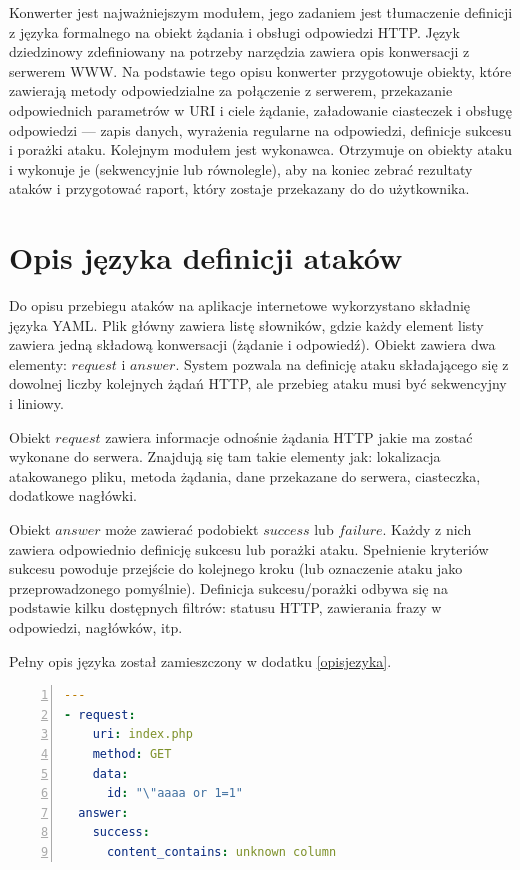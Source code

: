 \documentclass[11pt,a4paper,polish,thesis,oneside]{dcsbook}
\begin{document}
Konwerter jest najważniejszym modułem, jego zadaniem jest tłumaczenie definicji z języka formalnego na obiekt żądania i obsługi odpowiedzi HTTP. Język dziedzinowy zdefiniowany na potrzeby narzędzia zawiera opis konwersacji z serwerem WWW. Na podstawie tego opisu konwerter przygotowuje obiekty, które zawierają metody odpowiedzialne za połączenie z serwerem, przekazanie odpowiednich parametrów w URI i ciele żądanie, załadowanie ciasteczek i obsługę odpowiedzi --- zapis danych, wyrażenia regularne na odpowiedzi, definicje sukcesu i porażki ataku.
Kolejnym modułem jest wykonawca. Otrzymuje on obiekty ataku i wykonuje je (sekwencyjnie lub równolegle), aby na koniec zebrać rezultaty ataków i przygotować raport, który zostaje przekazany do do użytkownika.
 
\section{Opis języka definicji ataków} 
Do opisu przebiegu ataków na aplikacje internetowe wykorzystano składnię języka YAML.
Plik główny zawiera listę słowników, gdzie każdy element listy zawiera jedną składową konwersacji (żądanie i odpowiedź). Obiekt zawiera dwa elementy: $request$ i $answer$. System pozwala na definicję ataku składającego się z dowolnej liczby kolejnych żądań HTTP, ale przebieg ataku musi być sekwencyjny i liniowy.

Obiekt $request$ zawiera informacje odnośnie żądania HTTP jakie ma zostać wykonane do serwera. Znajdują się tam takie elementy jak: lokalizacja atakowanego pliku, metoda żądania, dane przekazane do serwera, ciasteczka, dodatkowe nagłówki.

Obiekt $answer$ może zawierać podobiekt $success$ lub $failure$. Każdy z nich zawiera odpowiednio definicję sukcesu lub porażki ataku. Spełnienie kryteriów sukcesu powoduje przejście do kolejnego kroku (lub oznaczenie ataku jako przeprowadzonego pomyślnie). Definicja sukcesu/porażki odbywa się na podstawie kilku dostępnych filtrów: statusu HTTP, zawierania frazy w odpowiedzi, nagłówków, itp.

Pełny opis języka został zamieszczony w dodatku \ref{opisjezyka}.

\begin{lstlisting}[language=YAML,frame=single,label=def1,numbers=left,caption=przykład podstawowej definicji ataku]
---
- request:
    uri: index.php
    method: GET
    data:
      id: "\"aaaa or 1=1"
  answer:
    success:
      content_contains: unknown column
\end{lstlisting}
\end{document}
